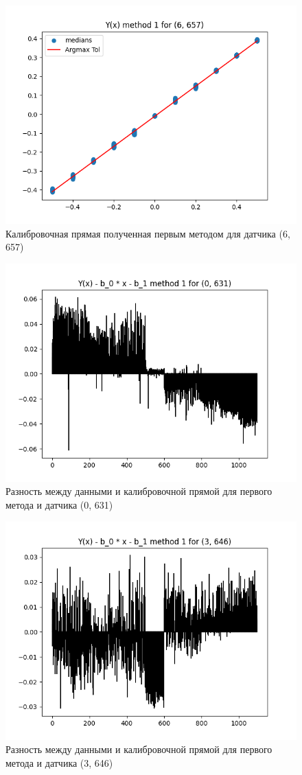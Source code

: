\begin{figure}[H]
    \centering
    \includegraphics[width=0.7\linewidth]{image/6_657_method_1.png}
    \caption{Калибровочная прямая полученная первым методом для датчика (6, 657)}
    \label{fig:6_657_method_1}
\end{figure}

\begin{figure}[H]
    \centering
    \includegraphics[width=0.7\linewidth]{image/0_631_method_1_difference.png}
    \caption{ Разность между данными и калибровочной прямой для первого метода и датчика (0, 631)}
    \label{fig:0_631_method_1_difference}
\end{figure}

\begin{figure}[H]
    \centering
    \includegraphics[width=0.7\linewidth]{image/3_646_method_1_difference.png}
    \caption{ Разность между данными и калибровочной прямой для первого метода и датчика (3, 646)}
    \label{fig:3_646_method_1_difference}
\end{figure}

